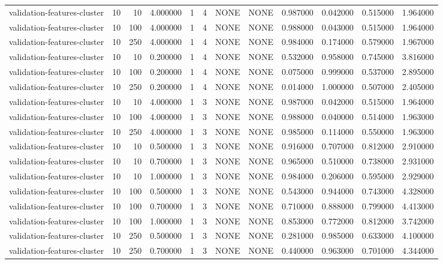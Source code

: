 \begin{tabular}{lrrrllllrrrr}
validation-features-cluster & 10 & 10 & 4.000000 & 1 & 4 & NONE & NONE & 0.987000 & 0.042000 & 0.515000 & 1.964000 \\
validation-features-cluster & 10 & 100 & 4.000000 & 1 & 4 & NONE & NONE & 0.988000 & 0.043000 & 0.515000 & 1.964000 \\
validation-features-cluster & 10 & 250 & 4.000000 & 1 & 4 & NONE & NONE & 0.984000 & 0.174000 & 0.579000 & 1.967000 \\
validation-features-cluster & 10 & 10 & 0.200000 & 1 & 4 & NONE & NONE & 0.532000 & 0.958000 & 0.745000 & 3.816000 \\
validation-features-cluster & 10 & 100 & 0.200000 & 1 & 4 & NONE & NONE & 0.075000 & 0.999000 & 0.537000 & 2.895000 \\
validation-features-cluster & 10 & 250 & 0.200000 & 1 & 4 & NONE & NONE & 0.014000 & 1.000000 & 0.507000 & 2.405000 \\
validation-features-cluster & 10 & 10 & 4.000000 & 1 & 3 & NONE & NONE & 0.987000 & 0.042000 & 0.515000 & 1.964000 \\
validation-features-cluster & 10 & 100 & 4.000000 & 1 & 3 & NONE & NONE & 0.988000 & 0.040000 & 0.514000 & 1.963000 \\
validation-features-cluster & 10 & 250 & 4.000000 & 1 & 3 & NONE & NONE & 0.985000 & 0.114000 & 0.550000 & 1.963000 \\
validation-features-cluster & 10 & 10 & 0.500000 & 1 & 3 & NONE & NONE & 0.916000 & 0.707000 & 0.812000 & 2.910000 \\
validation-features-cluster & 10 & 10 & 0.700000 & 1 & 3 & NONE & NONE & 0.965000 & 0.510000 & 0.738000 & 2.931000 \\
validation-features-cluster & 10 & 10 & 1.000000 & 1 & 3 & NONE & NONE & 0.984000 & 0.206000 & 0.595000 & 2.929000 \\
validation-features-cluster & 10 & 100 & 0.500000 & 1 & 3 & NONE & NONE & 0.543000 & 0.944000 & 0.743000 & 4.328000 \\
validation-features-cluster & 10 & 100 & 0.700000 & 1 & 3 & NONE & NONE & 0.710000 & 0.888000 & 0.799000 & 4.413000 \\
validation-features-cluster & 10 & 100 & 1.000000 & 1 & 3 & NONE & NONE & 0.853000 & 0.772000 & 0.812000 & 3.742000 \\
validation-features-cluster & 10 & 250 & 0.500000 & 1 & 3 & NONE & NONE & 0.281000 & 0.985000 & 0.633000 & 4.100000 \\
validation-features-cluster & 10 & 250 & 0.700000 & 1 & 3 & NONE & NONE & 0.440000 & 0.963000 & 0.701000 & 4.344000 \\

\end{tabular}
